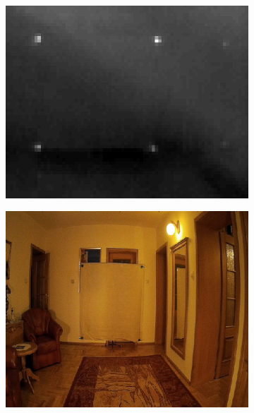 \begin{figure}[h]
\centering
\begin{subfigure}{0.47\textwidth}
\centering
\includegraphics[width=0.9\linewidth]{images/calibrationThermal}
\subcaption{\label{fig:calibrationThermal}}
\end{subfigure}
\begin{subfigure}{0.47\textwidth}
\centering
\includegraphics[width=0.9\linewidth]{images/calibrationRGB}
\subcaption{\label{fig:calibrationRGB}}
\end{subfigure}
\begin{subfigure}{0.47\textwidth}
\centering

\end{subfigure}
\end{figure}
